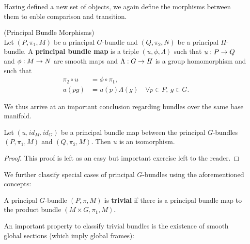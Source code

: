Having defined a new set of objects, we again define the morphisms between them to enble comparison and transition.

\begin{definition} (Principal Bundle Morphisms)\\
  Let $(P,\pi_1,M)$ be a principal $G$-bundle and $(Q,\pi_2, N)$ be a principal $H$-bundle. A \textbf{principal bundle map} is a triple $(u, \phi, \Lambda)$ such that $u: P \rightarrow Q$ and $\phi: M \ra N$ are smooth maps and $\Lambda: G \rightarrow H$ is a group homomorphism and such that
  \begin{align}
    \pi_2 \circ u &= \phi \circ \pi_1,\\
    u(pg) &= u(p) \Lambda(g) \quad \forall p \in P, \ g\in G.
  \end{align}
\end{definition}

We thus arrive at an important conclusion regarding bundles over the same base manifold.

\begin{theo}
  Let $(u,id_M,id_G)$ be a principal bundle map between the principal $G$-bundles $(P,\pi_1,M)$ and $(Q,\pi_2,M)$. Then $u$ is an isomorphism.
\begin{proof}
  This proof is left as an easy but important exercise left to the reader.
\end{proof}
\end{theo}

We further classify special cases of principal $G$-bundles using the aforementioned concepts:

\begin{definition}
  A principal $G$-bundle $(P,\pi,M)$ is \textbf{trivial} if there is a principal bundle map to the product bundle $(M\times G, \pi_1, M)$.
\end{definition}

An important property to classify trivial bundles is the existence of smooth global sections (which imply global frames):

